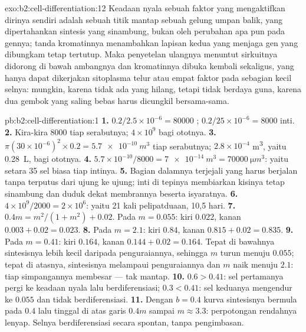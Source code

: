 \begin{solution}{exo:b2:cell-differentiation:12}
Keadaan nyala sebuah faktor yang mengaktifkan dirinya sendiri adalah
sebuah titik mantap sebuah gelung umpan balik, yang dipertahankan
sintesis yang sinambung, bukan oleh perubahan apa pun pada gennya;
tanda kromatinnya menambahkan lapisan kedua yang menjaga gen yang
dibungkam tetap tertutup. Maka penyetelan ulangnya menuntut sirkuitnya
didorong di bawah ambangnya dan kromatinnya dibuka kembali sekaligus,
yang hanya dapat dikerjakan sitoplasma telur atau empat faktor pada
sebagian kecil selnya: mungkin, karena tidak ada yang hilang, tetapi
tidak berdaya guna, karena dua gembok yang saling bebas harus dicungkil
bersama-sama.
\end{solution}

\begin{solution}{pb:b2:cell-differentiation:1}
\textbf{1.} $0.2/2.5\times 10^{-6} = \num{80000}$ ;
$0.2/25\times 10^{-6} = \num{8000}$ inti.
\textbf{2.} Kira-kira \num{8000} tiap serabutnya; $4\times 10^{9}$ bagi
ototnya.
\textbf{3.} $\pi(30\times 10^{-6})^{2}\times 0.2 = \qty{5.7e-10}{m^3}$
tiap serabutnya; $2.8\times 10^{-4}$ \unit{m^3}, yaitu \qty{0.28}{L},
bagi ototnya.
\textbf{4.} $5.7\times 10^{-10}/8000 = \qty{7e-14}{m^3} =
\qty{70000}{\micro m^3}$: yaitu setara 35 sel biasa tiap intinya.
\textbf{5.} Bagian dalamnya terjejali  yang harus berjalan
tanpa terputus dari ujung ke ujung; inti di tepinya membiarkan kisinya
tetap sinambung dan duduk dekat membrannya beserta isyaratnya.
\textbf{6.} $4\times 10^{9}/2000 = 2\times 10^{6}$: yaitu 21 kali
pelipatduaan, 10,5 hari.
\textbf{7.} $0.4m = m^{2}/(1 + m^{2}) + 0.02$. Pada $m = 0.055$: kiri
$0.022$, kanan $0.003 + 0.02 = 0.023$.
\textbf{8.} Pada $m = 2.1$: kiri $0.84$, kanan $0.815 + 0.02 = 0.835$.
\textbf{9.} Pada $m = 0.41$: kiri $0.164$, kanan $0.144 + 0.02 = 0.164$.
Tepat di bawahnya sintesisnya lebih kecil daripada penguraiannya,
sehingga $m$ turun menuju $0.055$; tepat di atasnya, sintesisnya
melampaui penguraiannya dan $m$ naik menuju $2.1$: tiap simpangannya
membesar --- tak mantap.
\textbf{10.} $0.6 > 0.41$: sel pertamanya pergi ke keadaan nyala lalu
berdiferensiasi; $0.3 < 0.41$: sel keduanya mengendur ke $0.055$ dan
tidak berdiferensiasi.
\textbf{11.} Dengan $b = 0.4$ kurva sintesisnya bermula pada $0.4$ lalu
tinggal di atas garis $0.4m$ sampai $m \approx 3.3$: perpotongan
rendahnya lenyap. Selnya berdiferensiasi secara spontan, tanpa
pengimbasan.

\end{solution}
